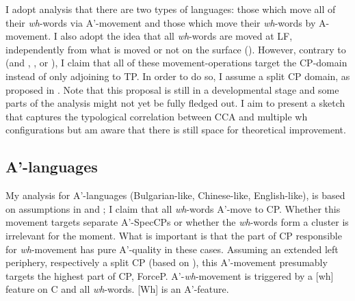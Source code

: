 \documentclass[output=paper,colorlinks,citecolor=brown]{langscibook}
\begin{document}
I adopt  analysis that there are two types of languages: those which move all of their \textit{wh}-words via A'-movement and those which move their \textit{wh}-words by A-movement. I also adopt the idea that all \textit{wh}-words are moved at LF, independently from what is moved or not on the surface (\citealp{huang1982move}). However, contrary to \citet{richards1997} (and \citealp{bovskovic2002multiple}, \citealp{citko1998multiple},  or \citealp{rudin1988multiple}), I claim that all of these movement-operations target the CP-domain instead of only adjoining to TP. In order to do so, I assume a split CP domain, as proposed in \citet{rizzi1997fine}. 
Note that this proposal is still in a developmental stage and some parts of the analysis might not yet be fully fledged out. I aim to present a sketch that captures the typological correlation between CCA and multiple wh configurations but am aware that there is still space for theoretical improvement.%

\subsection{A'-languages}
My analysis for A'-languages (Bulgarian-like, Chinese-like, English-like), is based on assumptions in \citet{richards1997} and \citet{rudin1988multiple}; I claim that all \textit{wh}-words A'-move to CP. Whether this movement targets separate A'-SpecCPs or whether the \textit{wh}-words form a cluster is irrelevant for the moment. What is important is that the part of CP responsible for \textit{wh}-movement has pure A'-quality in these cases. Assuming an extended left periphery, respectively a split CP (based on \citealp{rizzi1997fine}), this A'-movement presumably targets the highest part of CP, ForceP. A'-\textit{wh}-movement is triggered by a [wh] feature on C and all \textit{wh}-words. [Wh] is an A'-feature.
\end{document}

